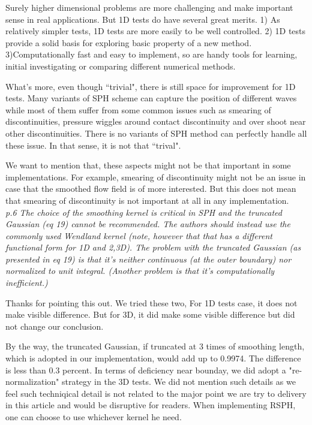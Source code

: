 \documentclass[10pt,a4paper]{article}
\begin{document}
Surely higher dimensional problems are more challenging and make important sense in real applications. 
But 1D tests do have several great merits. 1) As relatively simpler tests, 1D tests are more easily to be well controlled. 2) 1D tests provide a solid basis for exploring basic property of a new method. 3)Computationally fast and easy to implement, so are handy tools for learning, initial investigating or comparing different numerical methods. 

What's more, even though ``trivial", there is still space for improvement for 1D tests. Many variants of SPH scheme can capture the position of different waves while most of them suffer from some common issues such as smearing of discontinuities, pressure wiggles around contact discontinuity and over shoot near other discontinuities. There is no variants of SPH method can perfectly handle all these issue. In that sense, it is not that ``trival".

We want to mention that, these aspects might not be that important in some implementations. For example, smearing of discontinuity might not be an issue in case that the smoothed flow field is of more interested. But this does not mean that smearing of discontinuity is not important at all in any implementation.
\\[3pt]

\textit{p.6 The choice of the smoothing kernel is critical in SPH and the truncated Gaussian (eq 19) cannot be recommended. The authors should instead use the commonly used Wendland kernel (note, however that that has a different functional form for 1D and 2,3D). The problem with the truncated Gaussian (as presented in eq 19) is that it's neither continuous (at the outer boundary) nor normalized to unit integral. (Another problem is that it's computationally inefficient.)}

Thanks for pointing this out. We tried these two, For 1D tests case, it does not make visible difference. But for 3D, it did make some visible difference but did not change our conclusion.

By the way, the truncated Gaussian, if truncated at 3 times of smoothing length, which is adopted in our implementation, would add up to 0.9974. The difference is less than 0.3 percent. 
In terms of deficiency near bounday, we did adopt a "re-normalization" strategy in the 3D tests. We did not mention such details as we feel such techniqical detail is not related to the major point we are try to delivery in this article and would be disruptive for readers. 
When implementing RSPH, one can choose to use whichever kernel he need.
\\[3pt]
\end{document}
